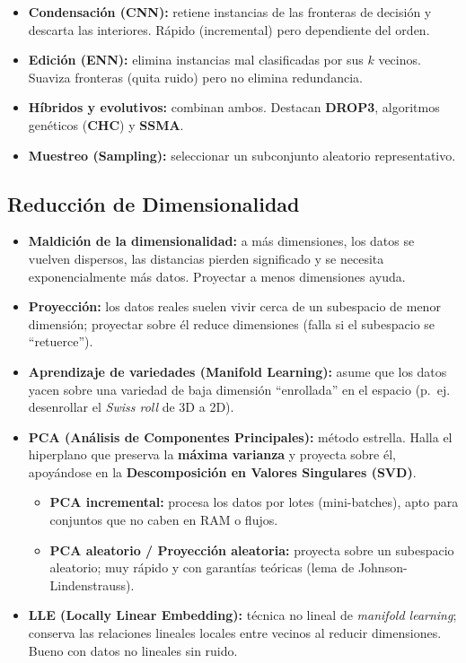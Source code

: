 \documentclass[12pt]{book} %
\providecommand{\tightlist}{%
  \setlength{\itemsep}{0pt}\setlength{\parskip}{0pt}}
\begin{document}
\begin{itemize}
\tightlist
\item
  \textbf{Condensación (CNN):} retiene instancias de las fronteras de
  decisión y descarta las interiores. Rápido (incremental) pero
  dependiente del orden.
\item
  \textbf{Edición (ENN):} elimina instancias mal clasificadas por sus
  \(k\) vecinos. Suaviza fronteras (quita ruido) pero no elimina
  redundancia.
\item
  \textbf{Híbridos y evolutivos:} combinan ambos. Destacan
  \textbf{DROP3}, algoritmos genéticos (\textbf{CHC}) y \textbf{SSMA}.
\item
  \textbf{Muestreo (Sampling):} seleccionar un subconjunto aleatorio
  representativo.
\end{itemize}

\hypertarget{reducciuxf3n-de-dimensionalidad}{%
\subsection{Reducción de
Dimensionalidad}\label{reducciuxf3n-de-dimensionalidad}}

\begin{itemize}
\tightlist
\item
  \textbf{Maldición de la dimensionalidad:} a más dimensiones, los datos
  se vuelven dispersos, las distancias pierden significado y se necesita
  exponencialmente más datos. Proyectar a menos dimensiones ayuda.
\item
  \textbf{Proyección:} los datos reales suelen vivir cerca de un
  subespacio de menor dimensión; proyectar sobre él reduce dimensiones
  (falla si el subespacio se ``retuerce'').
\item
  \textbf{Aprendizaje de variedades (Manifold Learning):} asume que los
  datos yacen sobre una variedad de baja dimensión ``enrollada'' en el
  espacio (p.~ej. desenrollar el \emph{Swiss roll} de 3D a 2D).
\item
  \textbf{PCA (Análisis de Componentes Principales):} método estrella.
  Halla el hiperplano que preserva la \textbf{máxima varianza} y
  proyecta sobre él, apoyándose en la \textbf{Descomposición en Valores
  Singulares (SVD)}.

  \begin{itemize}
  \tightlist
  \item
    \textbf{PCA incremental:} procesa los datos por lotes
    (mini-batches), apto para conjuntos que no caben en RAM o flujos.
  \item
    \textbf{PCA aleatorio / Proyección aleatoria:} proyecta sobre un
    subespacio aleatorio; muy rápido y con garantías teóricas (lema de
    Johnson-Lindenstrauss).
  \end{itemize}
\item
  \textbf{LLE (Locally Linear Embedding):} técnica no lineal de
  \emph{manifold learning}; conserva las relaciones lineales locales
  entre vecinos al reducir dimensiones. Bueno con datos no lineales sin
  ruido.
\end{itemize}
\end{document}
